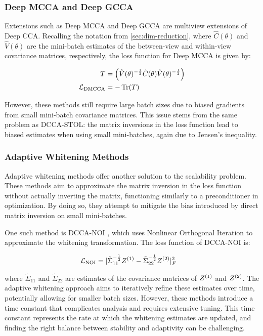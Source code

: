 \subsubsection{Deep MCCA and Deep GCCA}
Extensions such as Deep MCCA \citep{somandepalli2019multimodal} and Deep GCCA \citep{benton2017deep} are multiview extensions of Deep CCA. 
Recalling the notation from \ref{sec:dim-reduction}, where $\hat{C}(\theta)$ and $\hat{V}(\theta)$ are the mini-batch estimates of the between-view and within-view covariance matrices, respectively, the loss function for Deep MCCA is given by:

\begin{align}
    T      & = \left(\hat{V}(\theta)^{-\frac{1}{2}} \hat{C}(\theta)\hat{V}(\theta)^{-\frac{1}{2}}\right) \\
    \mathcal{L}_\text{DMCCA} & = -\operatorname{Tr}(T)
\end{align}

However, these methods still require large batch sizes due to biased gradients from small mini-batch covariance matrices. This issue stems from the same problem as DCCA-STOL: the matrix inversions in the loss function lead to biased estimates when using small mini-batches, again due to Jensen's inequality.

\subsubsection{Adaptive Whitening Methods}
Adaptive whitening methods \citep{wang2015stochastic, chang2018scalable} offer another solution to the scalability problem. These methods aim to approximate the matrix inversion in the loss function without actually inverting the matrix, functioning similarly to a preconditioner in optimization. By doing so, they attempt to mitigate the bias introduced by direct matrix inversion on small mini-batches.

One such method is DCCA-NOI \citep{wang2015unsupervised}, which uses Nonlinear Orthogonal Iteration to approximate the whitening transformation. The loss function of DCCA-NOI is:

\begin{align}
    \mathcal{L}_\text{NOI} & = |{\tilde{\Sigma}_{11}}^{-\frac{1}{2}} Z^{(1)}-{\tilde{\Sigma}_{22}}^{-\frac{1}{2}} Z^{(2)}|^2_F
\end{align}

where $\tilde{\Sigma}_{11}$ and $\tilde{\Sigma}_{22}$ are estimates of the covariance matrices of $Z^{(1)}$ and $Z^{(2)}$. The adaptive whitening approach aims to iteratively refine these estimates over time, potentially allowing for smaller batch sizes. However, these methods introduce a time constant that complicates analysis and requires extensive tuning. This time constant represents the rate at which the whitening estimates are updated, and finding the right balance between stability and adaptivity can be challenging.

